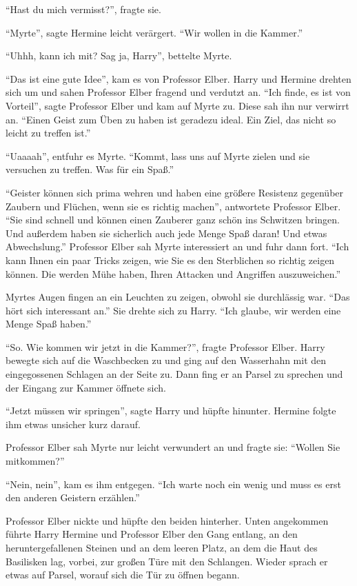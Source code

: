 \enquote{Hast du mich vermisst?}, fragte sie.

\enquote{Myrte}, sagte Hermine leicht verärgert. \enquote{Wir wollen in die Kammer.}

\enquote{Uhhh, kann ich mit? Sag ja, Harry}, bettelte Myrte.

\enquote{Das ist eine gute Idee}, kam es von Professor Elber. Harry und Hermine drehten sich um und sahen Professor Elber fragend und verdutzt an. \enquote{Ich finde, es ist von Vorteil}, sagte Professor Elber und kam auf Myrte zu. Diese sah ihn nur verwirrt an. \enquote{Einen Geist zum Üben zu haben ist geradezu ideal. Ein Ziel, das nicht so leicht zu treffen ist.}

\enquote{Uaaaah}, entfuhr es Myrte. \enquote{Kommt, lass uns auf Myrte zielen und sie versuchen zu treffen. Was für ein Spaß.}

\enquote{Geister können sich prima wehren und haben eine größere Resistenz gegenüber Zaubern und Flüchen, wenn sie es richtig machen}, antwortete Professor Elber. \enquote{Sie sind schnell und können einen Zauberer ganz schön ins Schwitzen bringen. Und außerdem haben sie sicherlich auch jede Menge Spaß daran! Und etwas Abwechslung.} Professor Elber sah Myrte interessiert an und fuhr dann fort. \enquote{Ich kann Ihnen ein paar Tricks zeigen, wie Sie es den Sterblichen so richtig zeigen können. Die werden Mühe haben, Ihren Attacken und Angriffen auszuweichen.}

Myrtes Augen fingen an ein Leuchten zu zeigen, obwohl sie durchlässig war. \enquote{Das hört sich interessant an.} Sie drehte sich zu Harry. \enquote{Ich glaube, wir werden eine Menge Spaß haben.}

\enquote{So. Wie kommen wir jetzt in die Kammer?}, fragte Professor Elber. Harry bewegte sich auf die Waschbecken zu und ging auf den Wasserhahn mit den eingegossenen Schlagen an der Seite zu. Dann fing er an Parsel zu sprechen und der Eingang zur Kammer öffnete sich.

\enquote{Jetzt müssen wir springen}, sagte Harry und hüpfte hinunter. Hermine folgte ihm etwas unsicher kurz darauf.

Professor Elber sah Myrte nur leicht verwundert an und fragte sie: \enquote{Wollen Sie mitkommen?}

\enquote{Nein, nein}, kam es ihm entgegen. \enquote{Ich warte noch ein wenig und muss es erst den anderen Geistern erzählen.}

Professor Elber nickte und hüpfte den beiden hinterher. Unten angekommen führte Harry Hermine und Professor Elber den Gang entlang, an den heruntergefallenen Steinen und an dem leeren Platz, an dem die Haut des Basilisken lag, vorbei, zur großen Türe mit den Schlangen. Wieder sprach er etwas auf Parsel, worauf sich die Tür zu öffnen begann.

